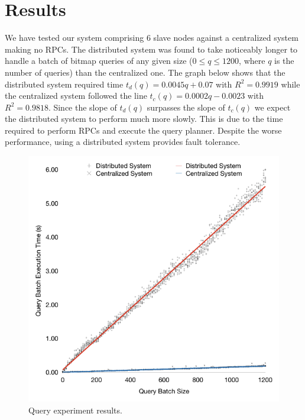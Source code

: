 \section{Results}
We have tested our system comprising 6 slave nodes against a centralized system making no RPCs.
The distributed system was found to take noticeably longer to handle a batch of bitmap queries of any given size
(\(0 \leq q \leq 1200\), where \(q\) is the number of queries) than the centralized one.
The graph below shows that the distributed system required time \(t_d(q) = 0.0045q + 0.07\) with \(R^2 = 0.9919\)
while the centralized system followed the line \(t_c(q) = 0.0002q - 0.0023\) with \(R^2 = 0.9818\).
Since the slope of \(t_d(q)\) surpasses the slope of \(t_c(q)\) we expect the distributed system to perform much more slowly.
This is due to the time required to perform RPCs and execute the query planner.
Despite the worse performance, using a distributed system provides fault tolerance.
\begin{figure}[h]
\centering
\includegraphics[width=\columnwidth]{query-experiment-results}
\caption{Query experiment results.}
\end{figure}
